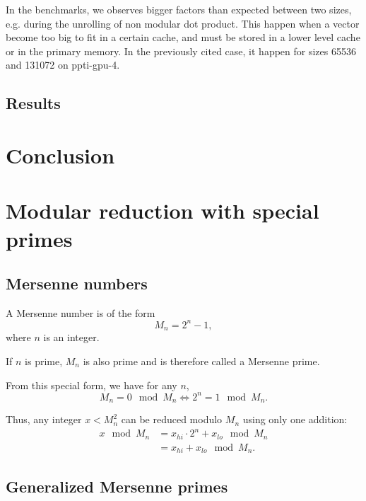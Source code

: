 \documentclass[a4paper]{article}
\begin{document}
In the benchmarks, we observes bigger factors than expected between two sizes,
e.g. during the unrolling of non modular dot product. This happen when a vector
become too big to fit in a certain cache, and must be stored in a lower level
cache or in the primary memory. In the previously cited case, it happen for sizes
65536 and 131072 on ppti-gpu-4. %


\subsection{Results}

\section{Conclusion}

\section{Modular reduction with special primes}

\subsection{Mersenne numbers}

\begin{definition}
    A Mersenne number is of the form $$ M_n = 2^n-1,$$ where $n$ is an integer.

    If $n$ is prime, $M_n$ is also prime and is therefore called a Mersenne prime.
\end{definition}

From this special form, we have for any $n$,
\[
M_n = 0 \mod M_n \Longleftrightarrow 2^n = 1 \mod M_n.
\]

Thus, any integer $x < M_n^2$ can be reduced modulo $M_n$ using only one addition: 
\begin{align*}
x \mod M_n &= x_{hi}\cdot 2^{n} + x_{lo} \mod M_n \\
    &= x_{hi} + x_{lo} \mod M_n.
\end{align*}


\subsection{Generalized Mersenne primes}


\newpage
 
 
\nocite{*}
\end{document}

